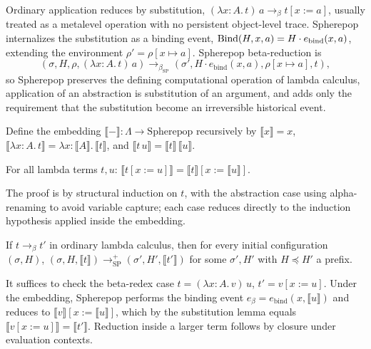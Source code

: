 Ordinary application reduces by substitution, $(\lambda x{:}A.\,t)\,a \longrightarrow_\beta t[x:=a]$, usually treated as a metalevel operation with no persistent object-level trace. Spherepop internalizes the substitution as a binding event, $\mathrm{Bind}(H,x,a) = H \cdot e_{\mathrm{bind}}(x,a)$, extending the environment $\rho' = \rho[x \mapsto a]$. Spherepop beta-reduction is
\[
(\sigma, H, \rho, (\lambda x{:}A.\,t)\,a) \longrightarrow_{\beta_{\mathrm{SP}}} (\sigma', H \cdot e_{\mathrm{bind}}(x,a), \rho[x\mapsto a], t),
\]
so Spherepop preserves the defining computational operation of lambda calculus, application of an abstraction is substitution of an argument, and adds only the requirement that the substitution become an irreversible historical event.

Define the embedding $\llbracket - \rrbracket : \Lambda \to \mathrm{Spherepop}$ recursively by $\llbracket x \rrbracket = x$, $\llbracket \lambda x{:}A.\,t \rrbracket = \lambda x{:}\llbracket A \rrbracket.\, \llbracket t \rrbracket$, and $\llbracket t\,u \rrbracket = \llbracket t \rrbracket\, \llbracket u \rrbracket$.

\begin{proposition}
For all lambda terms $t,u$: $\llbracket t[x:=u] \rrbracket = \llbracket t \rrbracket[x := \llbracket u \rrbracket]$.
\end{proposition}

The proof is by structural induction on $t$, with the abstraction case using alpha-renaming to avoid variable capture; each case reduces directly to the induction hypothesis applied inside the embedding.

\begin{theorem}[Simulation]
If $t \longrightarrow_\beta t'$ in ordinary lambda calculus, then for every initial configuration $(\sigma, H)$, $(\sigma, H, \llbracket t \rrbracket) \longrightarrow_{\mathrm{SP}}^{+} (\sigma', H', \llbracket t' \rrbracket)$ for some $\sigma', H'$ with $H \preceq H'$ a prefix.
\end{theorem}

It suffices to check the beta-redex case $t = (\lambda x{:}A.\,v)\,u$, $t' = v[x:=u]$. Under the embedding, Spherepop performs the binding event $e_\beta = e_{\mathrm{bind}}(x, \llbracket u \rrbracket)$ and reduces to $\llbracket v \rrbracket[x := \llbracket u \rrbracket]$, which by the substitution lemma equals $\llbracket v[x:=u] \rrbracket = \llbracket t' \rrbracket$. Reduction inside a larger term follows by closure under evaluation contexts.

